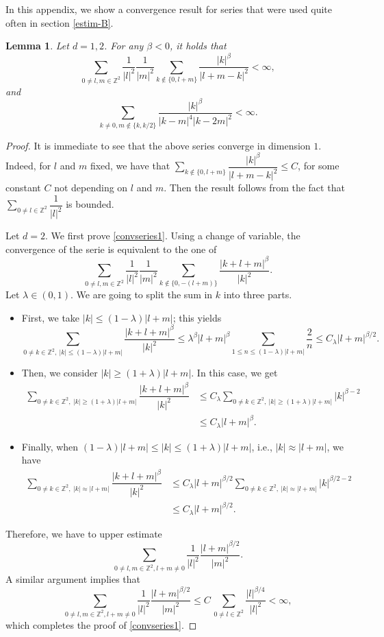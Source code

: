 \documentclass[11pt,leqno]{amsart}
\newtheorem{lem}{Lemma}[section]
\newcommand{\Z}{\mathbb{Z}}
\begin{document}
In this appendix, we show a convergence result for  series that were used quite often in section \ref{estim-B}.

\begin{lem}
\label{convseries} Let $d=1,2$. 
For any $\beta<0$, it holds that
\begin{equation} \label{convseries1}
\sum_{0\neq l,m\in \Z^2} \dfrac{1}{|l|^2}\dfrac{1}{|m|^2} \sum_{k\not\in \{0, l+m\}} \dfrac{|k|^{\beta}}{|l+m-k|^2}<\infty, 
\end{equation}
and
\begin{equation}  \label{convseries2}
\sum_{k\neq 0, m\not\in \{k, k/2\} } \dfrac{|k|^{\beta}}{|k-m|^4 |k-2m|^2}<\infty.
\end{equation}
\end{lem}
\begin{proof}
It is immediate to see that the above series converge in dimension $1$. Indeed, for $l$ and $m$ fixed, we have that $ \sum_{k\not\in \{0, l+m\}} \dfrac{|k|^{\beta}}{|l+m-k|^2}\leq C$, for some constant $C$ not depending on $l$ and $m$. Then the result follows from the fact that $\sum_{0\neq l\in \Z^2} \dfrac{1}{|l|^2}$ is bounded.

Let $d=2$. We first prove \eqref{convseries1}. Using a change of variable, the convergence of the serie is equivalent to the one of
$$\sum_{0\neq l,m \in \Z^2} \dfrac{1}{|l|^2}\dfrac{1}{|m|^2} \sum_{k \not\in \{0, -(l+m)\} }\dfrac{|k+l+m|^{\beta}}{|k|^2}.$$
Let $\lambda \in (0,1).$ We are going to split the sum in $k$ into three parts. 
\begin{itemize}
\item First, we take $|k|\leq (1-\lambda) |l+m|$; this yields 
$$\sum_{0 \neq k \in \Z^2,\ |k|\leq (1-\lambda) |l+m|} \dfrac{|k+l+m|^{\beta}}{|k|^2} \leq \lambda^{\beta} |l+m|^{\beta} \sum_{1\leq n \leq (1-\lambda)|l+m| } \dfrac{2}{n} \leq C_\lambda |l+m|^{\beta /2}. $$
\item Then, we consider $|k|\geq (1+\lambda)|l+m|$. In this case, we get 
\begin{align*}
\sum_{0 \neq k \in \Z^2,\ |k|\geq (1+\lambda) |l+m|} \dfrac{|k+l+m|^{\beta}}{|k|^2}& \leq C_\lambda \sum_{0 \neq k \in \Z^2,\ |k|\geq (1+\lambda) |l+m|}   |k|^{\beta - 2} \\  
& \leq C_\lambda   |l+m|^{\beta }. 
\end{align*}
\item Finally, when $(1-\lambda )|l+m| \leq |k|\leq (1+\lambda)|l+m|$, i.e.,  $|k|\approx |l+m|$, we have
\begin{align*}
\sum_{0 \neq k \in \Z^2,\ |k|\approx |l+m|} \dfrac{|k+l+m|^{\beta}}{|k|^2}& \leq C_\lambda |l+m|^{\beta /2} \sum_{0 \neq k \in \Z^2,\ |k|\approx |l+m|} |k|^{\beta/2 -2} \\
& \leq C_\lambda |l+m|^{\beta /2}. 
\end{align*}
\end{itemize}
 Therefore, we have to upper  estimate
$$\sum_{0\neq l,m \in \Z^2, l+m\neq 0} \dfrac{1}{|l|^2}\dfrac{|l+m|^{\beta/2}}{|m|^2}.$$
A similar argument implies  that
$$\sum_{0\neq l,m\in \Z^2, l+m\neq 0} \dfrac{1}{|l|^2}\dfrac{|l+m|^{\beta/2}}{|m|^2} \leq  C \, \sum_{0\neq l \in \Z^2} \dfrac{|l|^{\beta/4}}{|l|^2} <\infty, $$
which completes the proof of \eqref{convseries1}.


\end{proof}
\end{document}
